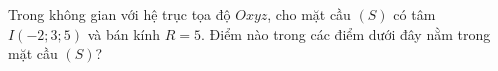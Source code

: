 \begin{ex}
Trong không gian với hệ trục tọa độ $Oxyz$, cho mặt cầu $(S)$ có tâm $I(-2;3;5)$ và bán kính $R=5$. Điểm nào trong các điểm dưới đây nằm trong mặt cầu $(S)$?
\end{ex}
